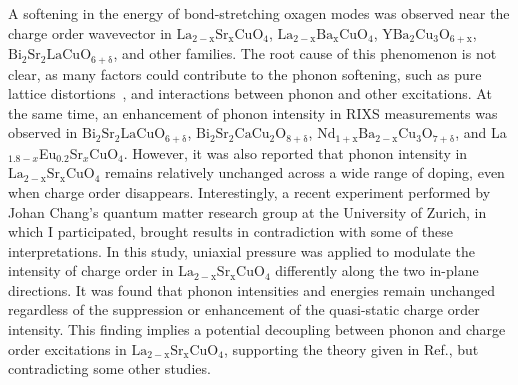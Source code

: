 \documentclass[11pt]{article}
\begin{document}
%
A softening in the energy of bond-stretching oxagen modes was observed near the charge order wavevector in $\mathrm{La_{2-x}Sr_{x}CuO_{4}}$\cite{lin_strongly_2020, wang_charge_2021, huang_quantum_2021}, $\mathrm{La_{2-x}Ba_{x}CuO_{4}}$\cite{miao_incommensurate_2018}, $\mathrm{YBa_{2}Cu_{3}O_{6+x}}$\cite{tacon_inelastic_2014}, $\mathrm{Bi_{2}Sr_{2}LaCuO_{6+\delta}}$\cite{li_multiorbital_2020}, and other families. 
The root cause of this phenomenon is not clear, as many factors could contribute to the phonon softening, such as pure lattice distortions~\cite{lin_strongly_2020}, and interactions between phonon and other excitations.  
At the same time, an enhancement of phonon intensity in RIXS measurements was observed in $\mathrm{Bi_{2}Sr_{2}LaCuO_{6+\delta}}$\cite{li_multiorbital_2020}, $\mathrm{Bi_{2}Sr_{2}CaCu_{2}O_{8+\delta}}$\cite{chaix_dispersive_2017}, $\mathrm{Nd_{1+x}Ba_{2-x}Cu_{3}O_{7+\delta}}$\cite{braicovich_determining_2020}, and {La$_{1.8-x}$Eu$_{0.2}$Sr$_x$CuO$_{4}$}\cite{peng_enhanced_2020,wang_charge_2021,huang_quantum_2021}. 
However, it was also reported that phonon intensity in $\mathrm{La_{2-x}Sr_{x}CuO_{4}}$ remains relatively unchanged across a wide range of doping, even when charge order disappears\cite{lin_strongly_2020}.  
Interestingly, a recent experiment performed by Johan Chang's quantum matter research group at the University of Zurich, in which I participated, brought results in contradiction with some of these interpretations.  
In this study, uniaxial pressure was applied to modulate the intensity of charge order in $\mathrm{La_{2-x}Sr_{x}CuO_{4}}$ differently along the two in-plane directions. 
It was found that phonon intensities and energies remain unchanged regardless of the suppression or enhancement of the quasi-static charge order intensity. 
This finding implies a potential decoupling between phonon and charge order excitations in $\mathrm{La_{2-x}Sr_{x}CuO_{4}}$, supporting the theory given in Ref.\cite{lin_strongly_2020}, but contradicting some other studies\cite{li_multiorbital_2020, chaix_dispersive_2017,huang_quantum_2021}. 
\end{document}
